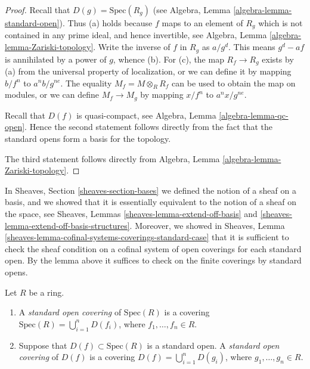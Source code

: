 \begin{proof}
Recall that $D(g) = \text{Spec}(R_g)$ (see
Algebra, Lemma \ref{algebra-lemma-standard-open}).
Thus (a) holds because $f$
maps to an element of $R_g$ which is not
contained in any prime ideal, and hence invertible,
see Algebra, Lemma \ref{algebra-lemma-Zariski-topology}.
Write the inverse of $f$ in $R_g$ as $a/g^d$.
This means $g^d - af$ is annihilated by a power of $g$, whence (b).
For (c), the map $R_f \to R_g$ exists by (a) from the universal property
of localization, or we can define it by mapping $b/f^n$
to $a^nb/g^{ne}$. The equality $M_f = M \otimes_R R_f$
can be used to obtain the map on modules, or
we can define $M_f \to M_g$ by mapping
$x/f^n$ to $a^nx/g^{ne}$.

\medskip\noindent
Recall that $D(f)$ is quasi-compact, see
Algebra, Lemma \ref{algebra-lemma-qc-open}.
Hence the second statement follows directly
from the fact that the standard opens form
a basis for the topology.

\medskip\noindent
The third statement follows directly from
Algebra, Lemma \ref{algebra-lemma-Zariski-topology}.
\end{proof}

\noindent
In Sheaves, Section \ref{sheaves-section-bases} we defined
the notion of a sheaf on a basis, and we showed that it is
essentially equivalent to the notion of a sheaf on the space,
see Sheaves, Lemmas \ref{sheaves-lemma-extend-off-basis} and
\ref{sheaves-lemma-extend-off-basis-structures}. Moreover,
we showed in
Sheaves, Lemma \ref{sheaves-lemma-cofinal-systems-coverings-standard-case}
that it is sufficient to check the sheaf
condition on a cofinal system of open coverings for each
standard open. By the lemma above it suffices to check
on the finite coverings by standard opens.

\begin{definition}
\label{definition-standard-covering}
Let $R$ be a ring.
\begin{enumerate}
\item A {\it standard open covering} of $\text{Spec}(R)$
is a covering $\text{Spec}(R) = \bigcup_{i = 1}^n D(f_i)$,
where $f_1, \ldots, f_n \in R$.
\item Suppose that $D(f) \subset \text{Spec}(R)$ is a standard
open. A {\it standard open covering} of $D(f)$
is a covering $D(f) = \bigcup_{i = 1}^n D(g_i)$,
where $g_1, \ldots, g_n \in R$.
\end{enumerate}
\end{definition}

